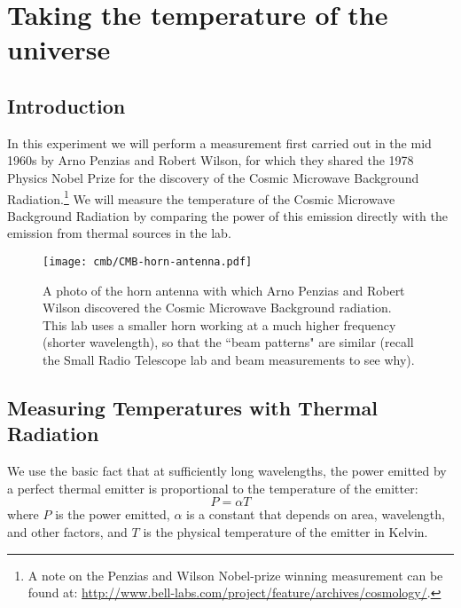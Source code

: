 \chapter{Taking the temperature of the universe}



\section*{Introduction}

In this experiment we will perform a measurement first carried out in the mid 1960s by Arno Penzias and Robert Wilson, for which they shared the 1978 Physics Nobel Prize for the discovery of the Cosmic Microwave Background Radiation.\footnote{A note on the Penzias and Wilson Nobel-prize winning measurement can be found at: \url{http://www.bell-labs.com/project/feature/archives/cosmology/}.}  We will measure the temperature of the Cosmic Microwave Background Radiation by comparing the  power of this emission directly with the emission from thermal sources in the lab. 

\begin{figure}[htbp]
	\begin{center}
		\texttt{[image: cmb/CMB-horn-antenna.pdf]}
		\caption{A photo of the horn antenna with which Arno Penzias and Robert Wilson discovered the Cosmic Microwave Background radiation. This lab uses a smaller horn working at a much higher frequency (shorter wavelength), so that the ``beam patterns" are similar (recall the Small Radio Telescope lab and beam measurements to see why). }
		\label{fig:PW-horn}
	\end{center}
\end{figure}

\section{Measuring Temperatures with Thermal Radiation}

We use the basic fact that at sufficiently long wavelengths, the power emitted by a perfect thermal emitter is proportional to the temperature of the emitter:
\begin{equation}
P = \alpha T
\label{one}
\end{equation}
where $P$ is the power emitted, $\alpha$ is a constant that depends on area, wavelength, and other factors, and $T$ is the physical temperature of the emitter in Kelvin. 

